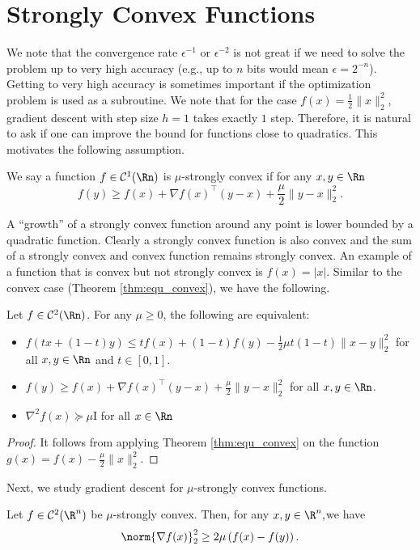 \section{Strongly Convex Functions}

We note that the convergence rate $\epsilon^{-1}$ or $\epsilon^{-2}$
is not great if we need to solve the problem up to very high accuracy
(e.g., up to $n$ bits would mean $\epsilon=2^{-n}$). Getting to
very high accuracy is sometimes important if the optimization problem
is used as a subroutine. We note that for the case $f(x)=\frac{1}{2}\|x\|_{2}^{2}$,
gradient descent with step size $h=1$ takes exactly $1$ step. Therefore,
it is natural to ask if one can improve the bound for functions close
to quadratics. This motivates the following assumption.
\begin{defn}
We say a function $f\in\mathcal{C}^{1}(\Rn)$ is $\mu$-strongly convex
if for any $x,y\in\Rn$ 
\[
f(y)\geq f(x)+\nabla f(x)^{\top}(y-x)+\frac{\mu}{2}\|y-x\|_{2}^{2}.
\]
\end{defn}

A ``growth'' of a strongly convex function around any point is lower
bounded by a quadratic function. Clearly a strongly convex function
is also convex and the sum of a strongly convex and convex function
remains strongly convex. An example of a function that is convex but
not strongly convex is $f(x)=\left|x\right|$. Similar to the convex
case (Theorem \ref{thm:equ_convex}), we have the following.
\begin{thm}
Let $f\in\mathcal{C}^{2}(\Rn)$. For any $\mu\geq0$, the following
are equivalent:
\begin{itemize}
\item $f(tx+(1-t)y)\leq tf(x)+(1-t)f(y)-\frac{1}{2}\mu t(1-t)\|x-y\|_{2}^{2}$
for all $x,y\in\Rn$ and $t\in[0,1]$.
\item $f(y)\geq f(x)+\nabla f(x)^{\top}(y-x)+\frac{\mu}{2}\|y-x\|_{2}^{2}$
for all $x,y\in\Rn$.
\item $\nabla^{2}f(x)\succeq\mu$I for all $x\in\Rn$
\end{itemize}
\end{thm}

\begin{proof}
It follows from applying Theorem \ref{thm:equ_convex} on the function
$g(x)=f(x)-\frac{\mu}{2}\|x\|_{2}^{2}$.
\end{proof}
Next, we study gradient descent for $\mu$-strongly convex functions.
\begin{lem}
\label{lem:strongly_convex}Let $f\in\mathcal{C}^{2}(\R^{n})$ be
$\mu$-strongly convex. Then, for any $x,y\in\R^{n},$we have
\[
\norm{\nabla f(x)}_{2}^{2}\ge2\mu\left(f(x)-f(y)\right).
\]
\end{lem}

